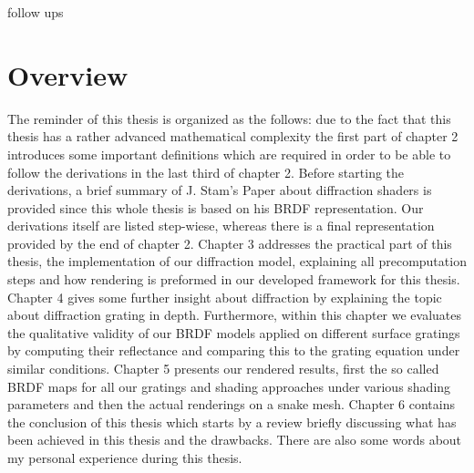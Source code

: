 follow ups


\section{Overview}
The reminder of this thesis is organized as the follows: due to the fact that this thesis has a rather advanced mathematical complexity the first part of chapter 2 introduces some important definitions which are required in order to be able to follow the derivations in the last third of chapter 2. Before starting the derivations, a brief summary of J. Stam's Paper about diffraction shaders is provided since this whole thesis is based on his BRDF representation. Our derivations itself are listed step-wiese, whereas there is a final representation provided by the end of chapter 2. Chapter 3 addresses the practical part of this thesis, the implementation of our diffraction model, explaining all precomputation steps and how rendering is preformed in our developed framework for this thesis. Chapter 4  gives some further insight about diffraction by explaining the topic about diffraction grating in depth. Furthermore, within this chapter we evaluates the qualitative validity of our BRDF models applied on different surface gratings by computing their reflectance and comparing this to the grating equation under similar conditions. Chapter 5 presents our rendered results, first the so called BRDF maps for all our gratings and shading approaches under various shading parameters and then the actual renderings on a snake mesh. Chapter 6 contains the conclusion of this thesis which starts by a review briefly discussing what has been achieved in this thesis and the drawbacks. There are also some words about my personal experience during this thesis.
